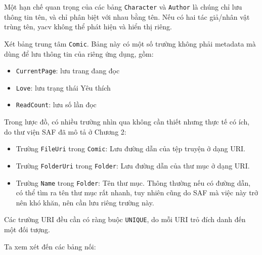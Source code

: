 \documentclass[
]{article}
\providecommand{\tightlist}{%
  \setlength{\itemsep}{0pt}\setlength{\parskip}{0pt}}
\begin{document}
Một hạn chế quan trọng của các bảng \texttt{Character} và
\texttt{Author} là chúng chỉ lưu thông tin tên, và chỉ phân biệt với
nhau bằng tên. Nếu có hai tác giả/nhân vật trùng tên, yacv không thể
phát hiện và hiển thị riêng.

Xét bảng trung tâm \texttt{Comic}. Bảng này có một số trường không phải
metadata mà dùng để lưu thông tin của riêng ứng dụng, gồm:

\begin{itemize}
\tightlist
\item
  \texttt{CurrentPage}: lưu trang đang đọc
\item
  \texttt{Love}: lưu trạng thái Yêu thích
\item
  \texttt{ReadCount}: lưu số lần đọc
\end{itemize}

Trong lược đồ, có nhiều trường nhìn qua không cần thiết nhưng thực tế có
ích, do thư viện SAF đã mô tả ở Chương 2:

\begin{itemize}
\tightlist
\item
  Trường \texttt{FileUri} trong \texttt{Comic}: Lưu đường dẫn của tệp
  truyện ở dạng URI.
\item
  Trường \texttt{FolderUri} trong \texttt{Folder}: Lưu đường dẫn của thư
  mục ở dạng URI.
\item
  Trường \texttt{Name} trong \texttt{Folder}: Tên thư mục. Thông thường
  nếu có đường dẫn, có thể tìm ra tên thư mục rất nhanh, tuy nhiên cũng
  do SAF mà việc này trở nên khó khăn, nên cần lưu riêng trường này.
\end{itemize}

Các trường URI đều cần có ràng buộc \texttt{UNIQUE}, do mỗi URI trỏ đích
danh đến một đối tượng.

Ta xem xét đến các bảng nối:
\end{document}
